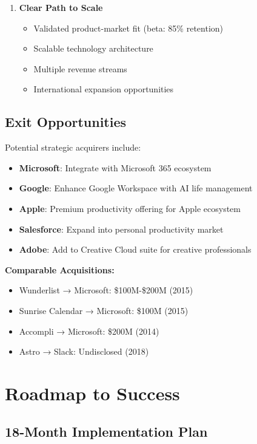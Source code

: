 \begin{enumerate}
    \item \textbf{Clear Path to Scale}
    \begin{itemize}
        \item Validated product-market fit (beta: 85\% retention)
        \item Scalable technology architecture
        \item Multiple revenue streams
        \item International expansion opportunities
    \end{itemize}
\end{enumerate}

\subsection{Exit Opportunities}

Potential strategic acquirers include:

\begin{itemize}
    \item \textbf{Microsoft}: Integrate with Microsoft 365 ecosystem
    \item \textbf{Google}: Enhance Google Workspace with AI life management
    \item \textbf{Apple}: Premium productivity offering for Apple ecosystem
    \item \textbf{Salesforce}: Expand into personal productivity market
    \item \textbf{Adobe}: Add to Creative Cloud suite for creative professionals
\end{itemize}

\textbf{Comparable Acquisitions:}
\begin{itemize}
    \item Wunderlist → Microsoft: \$100M-\$200M (2015)
    \item Sunrise Calendar → Microsoft: \$100M (2015)
    \item Accompli → Microsoft: \$200M (2014)
    \item Astro → Slack: Undisclosed (2018)
\end{itemize}

\section{Roadmap to Success}

\subsection{18-Month Implementation Plan}

